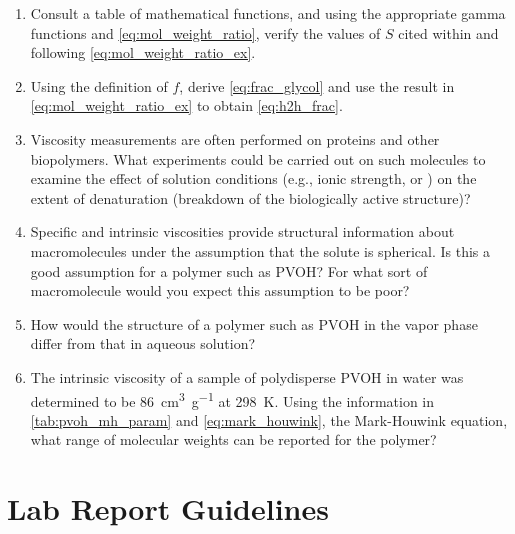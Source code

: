 \documentclass[nobib,nofonts,nols,nohyper]{tufte-handout}
\begin{document}
\begin{enumerate}
	\item Consult a table of mathematical functions, and using the appropriate gamma functions and \cref{eq:mol_weight_ratio}, verify the values of \( S \) cited within and following \cref{eq:mol_weight_ratio_ex}.
	\item Using the definition of \( f \), derive \cref{eq:frac_glycol} and use the result in \cref{eq:mol_weight_ratio_ex} to obtain \cref{eq:h2h_frac}.
	\item Viscosity measurements are often performed on proteins and other biopolymers. 
	What experiments could be carried out on such molecules to examine the effect of solution conditions (e.g., ionic strength, or \ch{\pH}) on the extent of denaturation (breakdown of the biologically active structure)?
	\item Specific and intrinsic viscosities provide structural information about macromolecules under the assumption that the solute is spherical. 
	Is this a good assumption for a polymer such as PVOH? 
	For what sort of macromolecule would you expect this assumption to be poor?
	\item How would the structure of a polymer such as PVOH in the vapor phase differ from that in aqueous solution?
	\item The intrinsic viscosity of a sample of polydisperse PVOH in water was determined to be \qty{86}{\cm\cubed \per \g} at \qty{298}{\K}. 
	Using the information in \cref{tab:pvoh_mh_param} and \cref{eq:mark_houwink}, the Mark-Houwink equation, what range of molecular weights can be reported for the polymer?
\end{enumerate}

\section{Lab Report Guidelines} %
\label{sec:lab_report_guidelines}
\end{document}
